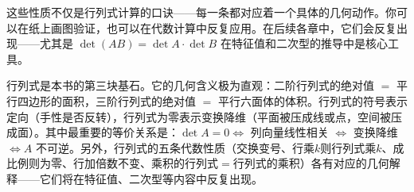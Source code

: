 这些性质不仅是行列式计算的口诀——每一条都对应着一个具体的几何动作。你可以在纸上画图验证，也可以在代数计算中反复应用。在后续各章中，它们会反复出现——尤其是 $\det(AB)=\det A\cdot\det B$ 在特征值和二次型的推导中是核心工具。


行列式是本书的第三块基石。它的几何含义极为直观：二阶行列式的绝对值 $=$ 平行四边形的面积，三阶行列式的绝对值 $=$ 平行六面体的体积。行列式的符号表示定向（手性是否反转），行列式为零表示变换降维（平面被压成线或点，空间被压成面）。其中最重要的等价关系是：$\det A=0 \Longleftrightarrow$ 列向量线性相关 $\Longleftrightarrow$ 变换降维 $\Longleftrightarrow A$ 不可逆。另外，行列式的五条代数性质（交换变号、行乘$k$则行列式乘$k$、成比例则为零、行加倍数不变、乘积的行列式$=$行列式的乘积）各有对应的几何解释——它们将在特征值、二次型等内容中反复出现。


